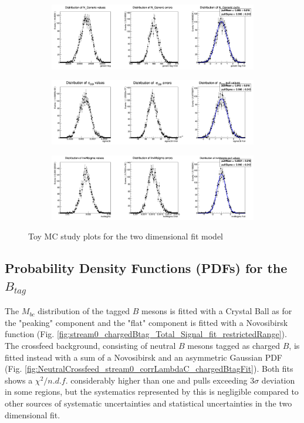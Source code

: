 \begin{figure}[H]
  \begin{subfigure}{14.5cm}
    \centering\includegraphics[width=13.8cm]{04-chargedCorrBtoLambda/figs/N_Generic_mcstudy.png}
  \end{subfigure}
  \begin{subfigure}{14.5cm}
    \centering\includegraphics[width=13.8cm]{04-chargedCorrBtoLambda/figs/sigmaCB1_mcstudy.png}
  \end{subfigure}
  \begin{subfigure}{14.5cm}
    \centering\includegraphics[width=13.8cm]{04-chargedCorrBtoLambda/figs/InvMsigma_mcstudy.png}
  \end{subfigure}
  \caption{Toy MC study plots for the two dimensional fit model}
\end{figure}

\newpage


\subsection{Probability Density Functions (PDFs) for the $B_{tag}$}
The $M_{bc}$ distribution of the tagged  $B$ mesons is fitted with a Crystal Ball as for the "peaking" component and the "flat" component is fitted with a Novosibirsk function (Fig. \ref{fig:stream0_chargedBtag_Total_Signal_fit_restrictedRange}). 
The crossfeed background, consisting of neutral $B$ mesons tagged as charged $B$, is fitted instead with a sum of a Novosibirsk and an asymmetric Gaussian PDF (Fig. \ref{fig:NeutralCrossfeed_stream0_corrLambdaC_chargedBtagFit}). 
Both fits shows a $\chi^2 /n.d.f.$ considerably higher than one and pulls exceeding 3$\sigma$ deviation in some regions, but the systematics represented by this is negligible compared to other sources of systematic uncertainties and statistical uncertainties in the two dimensional fit.


